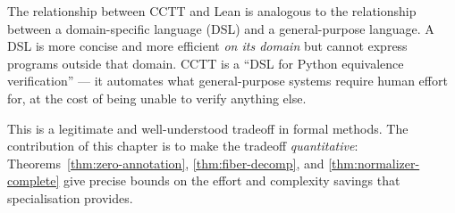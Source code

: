 \begin{remark}
The relationship between CCTT and Lean is analogous to the
relationship between a domain-specific language (DSL) and a
general-purpose language.  A DSL is more concise and more efficient
\emph{on its domain} but cannot express programs outside that domain.
CCTT is a ``DSL for Python equivalence verification'' — it automates
what general-purpose systems require human effort for, at the cost
of being unable to verify anything else.

This is a legitimate and well-understood tradeoff in formal methods.
The contribution of this chapter is to make the tradeoff
\emph{quantitative}: Theorems~\ref{thm:zero-annotation},
\ref{thm:fiber-decomp}, and \ref{thm:normalizer-complete} give
precise bounds on the effort and complexity savings that
specialisation provides.
\end{remark}

